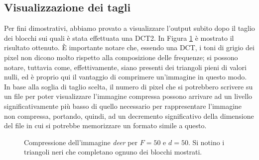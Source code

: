 \subsection{Visualizzazione dei tagli}
Per fini dimostrativi, abbiamo provato a visualizzare l'output subito dopo il taglio dei blocchi sui quali è stata effettuata una DCT2. In Figura \ref{fig:compression_values} è mostrato il risultato ottenuto. È importante notare che, essendo una DCT, i toni di grigio dei pixel non dicono molto rispetto alla composizione delle frequenze; si possono notare, tuttavia come, effettivamente, siano presenti dei triangoli pieni di valori nulli, ed è proprio qui il vantaggio di comprimere un'immagine in questo modo. In base alla soglia di taglio scelta, il numero di pixel che si potrebbero scrivere su un file per poter visualizzare l'immagine compressa possono arrivare ad un livello significativamente più basso di quello necessario per rappresentare l'immagine non compressa, portando, quindi, ad un decremento significativo della dimensione del file in cui si potrebbe memorizzare un formato simile a questo.

\begin{figure}%
	\centering
	\caption{Compressione dell'immagine \textit{deer} per $F=50$ e $d=50$. Si notino i triangoli neri che completano ognuno dei blocchi mostrati.}%
	\label{fig:compression_values}
\end{figure}


